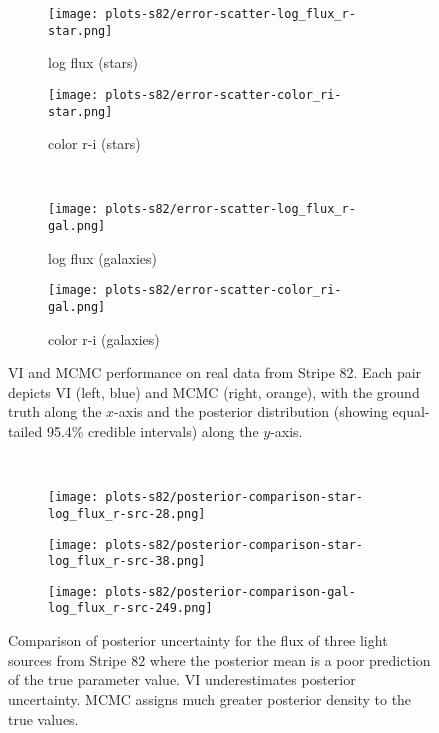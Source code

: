 \begin{figure}
\centering
\begin{subfigure}{.49\textwidth}
  \centering
  \texttt{[image: plots-s82/error-scatter-log\_flux\_r-star.png]}
  \caption{log flux (stars)}
\end{subfigure}
\begin{subfigure}{.49\textwidth}
  \centering
  \texttt{[image: plots-s82/error-scatter-color\_ri-star.png]}
  \caption{color r-i (stars)}
\end{subfigure}
\\
\begin{subfigure}{.49\textwidth}
  \centering
  \texttt{[image: plots-s82/error-scatter-log\_flux\_r-gal.png]}
  \caption{log flux (galaxies)}
\end{subfigure}
\begin{subfigure}{.49\textwidth}
  \centering
  \texttt{[image: plots-s82/error-scatter-color\_ri-gal.png]}
  \caption{color r-i (galaxies)}
\end{subfigure}
\caption{VI and MCMC performance on real data from Stripe 82.  Each pair depicts VI (left, blue) and MCMC (right, orange), with the ground truth along the $x$-axis and the posterior distribution (showing equal-tailed 95.4\% credible intervals) along the $y$-axis.}
\label{qq-real}
\end{figure}

\begin{table}
\scalebox{.75}{

}~
\scalebox{.75}{

}
\vspace{.5em}
\caption{%
Proportion of light sources having posterior means found by VI (left) and MCMC (right) near the ground truth for SDSS images.
Credible interval widths match standard deviations as described in Table~\ref{tab:calibration-synth}.}
\label{tab:calibration-s82}
\end{table}

\begin{figure}[b]
\begin{subfigure}{.32\textwidth}
  \centering
  \texttt{[image: plots-s82/posterior-comparison-star-log\_flux\_r-src-28.png]}
  \caption{}
\end{subfigure}
\begin{subfigure}{.32\textwidth}
  \centering
  \texttt{[image: plots-s82/posterior-comparison-star-log\_flux\_r-src-38.png]}
  \caption{}
\end{subfigure}
\begin{subfigure}{.32\textwidth}
  \centering
  \texttt{[image: plots-s82/posterior-comparison-gal-log\_flux\_r-src-249.png]}
  \caption{}
\end{subfigure}
  \caption{Comparison of posterior uncertainty for the flux of three light sources from Stripe 82 where the posterior mean is a poor prediction of the true parameter value. VI underestimates posterior uncertainty. MCMC assigns much greater posterior density to the true values.}
\label{uq-real}
\end{figure}


